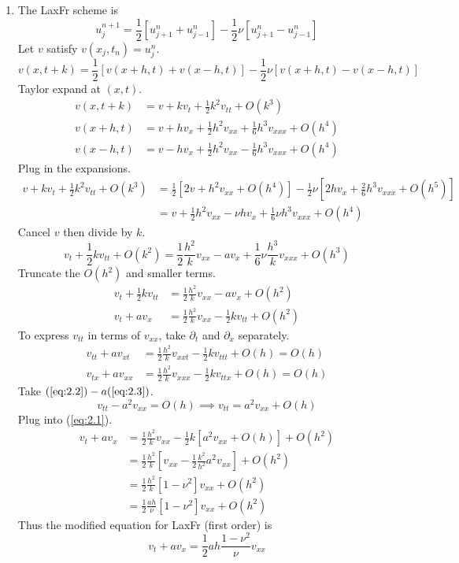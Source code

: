 \documentclass{article}
\newcommand{\sbr}[1]{\left[#1\right]}
\newcommand{\imp}{\implies}
\newcommand{\ptl}{\partial}
\begin{document}
\begin{enumerate}
\begin{enumerate}
\begin{enumerate}
		
		\item The LaxFr scheme is
		$$u_j^{n+1} = \frac12[u_{j+1}^n + u_{j-1}^n] - \frac12\nu[u_{j+1}^n - u_{j-1}^n]$$
		Let $v$ satisfy $v(x_j,t_n)=u_j^n$.
		$$v(x,t+k) = \frac12[v(x+h,t) + v(x-h,t)] - \frac12\nu[v(x+h,t) - v(x-h,t)]$$
		Taylor expand at $(x,t)$.
		\begin{align*}
			v(x,t+k) &= v + kv_t + \frac12k^2v_{tt} + O(k^3)\\
			v(x+h,t) &= v + hv_x + \frac12h^2v_{xx} + \frac16h^3v_{xxx} + O(h^4)\\
			v(x-h,t) &= v - hv_x + \frac12h^2v_{xx} - \frac16h^3v_{xxx} + O(h^4)
		\end{align*}
		Plug in the expansions.
		\begin{align*}
			v + kv_t + \frac12k^2v_{tt} + O(k^3) &= \frac12[2v + h^2v_{xx} + O(h^4)] - \frac12\nu\sbr{2hv_x + \frac26h^3v_{xxx} + O(h^5)}\\
			&= v + \frac12h^2v_{xx} - \nu hv_x + \frac16\nu h^3v_{xxx} + O(h^4)
		\end{align*}
		Cancel $v$ then divide by $k$.
		$$v_t + \frac12kv_{tt} + O(k^2) = \frac12\frac{h^2}{k}v_{xx} - av_x + \frac16\nu \frac{h^3}{k}v_{xxx} + O(h^3)$$
		Truncate the $O(h^2)$ and smaller terms.
		\begin{align}
			v_t + \frac12kv_{tt} &= \frac12\frac{h^2}{k}v_{xx} - av_x + O(h^2) \nonumber\\
			v_t + av_x &= \frac12\frac{h^2}{k}v_{xx} - \frac12kv_{tt} + O(h^2) \label{eq:2.1}
		\end{align}
		To express $v_{tt}$ in terms of $v_{xx}$, take $\ptl_t$ and $\ptl_x$ separately.
		\begin{align}
			v_{tt} + av_{xt} &= \frac12\frac{h^2}{k}v_{xxt} - \frac12kv_{ttt} + O(h) = O(h) \label{eq:2.2}\\
			v_{tx} + av_{xx} &= \frac12\frac{h^2}{k}v_{xxx} - \frac12kv_{ttx} + O(h) = O(h) \label{eq:2.3}
		\end{align}
		Take $(\ref{eq:2.2})-a(\ref{eq:2.3})$.
		$$v_{tt} - a^2v_{xx} = O(h)
		\imp v_{tt} = a^2v_{xx} + O(h)$$
		Plug into (\ref{eq:2.1}).
		\begin{align*}
			v_t + av_x &= \frac12\frac{h^2}{k}v_{xx} - \frac12k[a^2v_{xx} + O(h)] + O(h^2)\\
			&= \frac12\frac{h^2}{k}\sbr{v_{xx} - \frac12\frac{k^2}{h^2}a^2v_{xx}} + O(h^2)\\
			&= \frac12\frac{h^2}{k}[1-\nu^2]v_{xx} + O(h^2)\\
			&= \frac12\frac{ah}{\nu}[1-\nu^2]v_{xx} + O(h^2)
		\end{align*}
		Thus the modified equation for LaxFr (first order) is
		$$\boxed{v_t + av_x = \frac12ah\frac{1-\nu^2}{\nu}v_{xx}}$$
		

\end{enumerate}
\end{enumerate}
\end{enumerate}
\end{document}
